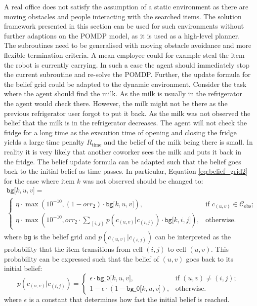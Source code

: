 A real office does not satisfy the assumption of a static environment as there are moving obstacles and people interacting with the searched items. 
The solution framework presented in this section can be used for such environments without further adaptions on the POMDP model, as it is used as a high-level planner. The subroutines need to be generalised with moving obstacle avoidance and more flexible termination criteria. A mean employee could for example steal the item the robot is currently carrying. In such a case the agent should immediately stop the current subroutine and re-solve the POMDP. Further, the update formula for the belief grid could be adapted to the dynamic environment. Consider the task where the agent should find the milk. As the milk is usually in the refrigerator the agent would check there. However, the milk might not be there as the previous refrigerator user forgot to put it back. As the milk was not observed the belief that the milk is in the refrigerator decreases. The agent will not check the fridge for a long time as the execution time of opening and closing the fridge yields a large time penalty $R_\text{time}$ and the belief of the milk being there is small. In reality it is very likely that another coworker sees the milk and puts it back in the fridge. The belief update formula can be adapted such that the belief goes back to the initial belief as time passes. In particular, Equation \ref{eq:belief_grid2} for the case where item $k$ was not observed should be changed to:
\begin{multline}
    \texttt{bg[$k, u, v$]} = \\
    \begin{cases} 
        \eta \cdot\max\left(10^{-10}, (1 -  orr_2) \cdot \texttt{bg[$k, u, v$]}\right), &\text{if }c_{(u,v)} \in \mathcal{C}_\text{obs};\\
        \eta \cdot \max\left(10^{-10}, orr_2 \cdot \sum_{(i,j)}p(c_{(u,v)}|c_{(i,j)}) \cdot \texttt{bg[$k, i, j$]}\right), &\text{otherwise}.
    \end{cases}
\end{multline}
where \texttt{bg} is the belief grid and $p(c_{(u,v)}|c_{(i,j)})$ can be interpreted as the probability that the item transitions from cell $(i,j)$ to cell $(u,v)$. This probability can be expressed such that the belief of $(u,v)$ goes back to its initial belief: 
\begin{equation}
    p(c_{(u,v)}|c_{(i,j)}) = \begin{cases}
    \epsilon \cdot \texttt{bg\_0[$k, u, v$]}, &\text{if } (u,v)\neq (i,j);\\
    1 - \epsilon \cdot (1-\texttt{bg\_0[$k, u, v$]}), &\text{otherwise}.
    \end{cases}
\end{equation}
where $\epsilon$ is a constant that determines how fast the initial belief is reached.\\

